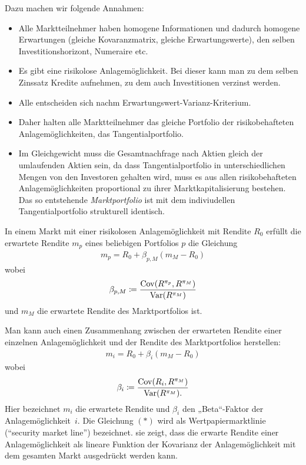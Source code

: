 \documentclass[a4paper,twoside,DIV15,BCOR12mm]{scrbook}
\DeclareMathOperator{\Var}{Var}
\DeclareMathOperator{\Cov}{Cov}
\begin{document}
Dazu machen wir folgende Annahmen:
\begin{itemize}
\item Alle Marktteilnehmer haben homogene Informationen und dadurch homogene Erwartungen (gleiche Kovaranzmatrix, gleiche Erwartungswerte), den selben Investitionshorizont, Numeraire etc.
\item Es gibt eine risikolose Anlagemöglichkeit. Bei dieser kann man zu dem selben Zinssatz Kredite aufnehmen, zu dem auch Investitionen verzinst werden.
\item Alle entscheiden sich nachm Erwartungswert-Varianz-Kriterium.
\item Daher halten alle Marktteilnehmer das gleiche Portfolio der risikobehafteten Anlagemöglichkeiten, das Tangentialportfolio.
\item Im Gleichgewicht muss die Gesamtnachfrage nach Aktien gleich der umlaufenden Aktien sein, da dass Tangentialportfolio in unterschiedlichen Mengen von den Investoren gehalten wird, muss es aus allen risikobehafteten Anlagemöglichkeiten proportional zu ihrer Marktkapitalisierung bestehen. Das so entstehende \emph{Marktportfolio} ist mit dem indiviudellen Tangentialportfolio strukturell identisch.
\end{itemize}

\begin{satz}
In einem Markt mit einer risikolosen Anlagemöglichkeit mit Rendite $R_0$ erfüllt die erwartete Rendite $m_p$ eines beliebigen Portfolios $p$ die Gleichung 
\begin{align*}
m_p = R_0 + \beta_{p,M}(m_M-R_0)
\end{align*}
wobei 
\begin{align*}
\beta_{p,M} \da \frac{\Cov(R^{\pi_p}, R^{\pi_M})}{\Var(R^{\pi_M})}
\end{align*}
und $m_M$ die erwartete Rendite des Marktportfolios ist.
\end{satz}

Man kann auch einen Zusammenhang zwischen der erwarteten Rendite einer einzelnen Anlagemöglichkeit und der Rendite des Marktportfolios herstellen:
\begin{align*}
m_i = R_0 + \beta_i(m_M - R_0) \tag{$*$}
\end{align*}
wobei
\[
\beta_i \da \frac{\Cov(R_i,R^{\pi_M})}{\Var(R^{\pi_M}).}
\]
Hier bezeichnet $m_i$ die erwartete Rendite und $\beta_i$ den „Beta“-Faktor der Anlagemöglichkeit~$i$.  Die Gleichung $(*)$ wird als Wertpapiermarktlinie (“security market line”) bezeichnet. sie zeigt, dass die erwarte Rendite einer Anlagemöglichkeit als lineare Funktion der Kovarianz der Anlagemöglichkeit mit dem gesamten Markt ausgedrückt werden kann.
\end{document}
